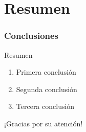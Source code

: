 \documentclass{beamer}
\newenvironment{caja}[1]{%
    \begin{beamerboxesrounded}[upper=upcol,lower=lowcol,shadow=true]{#1}%
}{%
    \end{beamerboxesrounded}%
}
\begin{document}
\section{Resumen}

\begin{frame}
    \frametitle{Conclusiones}
    
    \begin{caja}{Resumen}
        \begin{enumerate}
            \item Primera conclusión
            \item Segunda conclusión
            \item Tercera conclusión
        \end{enumerate}
    \end{caja}
    
    \vspace{1em}
    
    \begin{center}
        \Large ¡Gracias por su atención!
    \end{center}
\end{frame}
\end{document}
